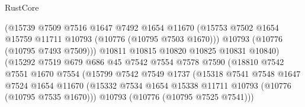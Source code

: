 \begin{lexlean}{RustCore}
\begin{coremodule}
                                    (@15739
                                      @7509
                                      @7516
                                      @1647
                                      @7492
                                      @1654
                                      @11670
                                      (@15753
                                        @7502
                                        @1654
                                        @15759
                                        @11711
                                        @10793
                                        (@10776 (@10795 @7503 @1670)))
                                      @10793
                                      (@10776 (@10795 @7493 @7509)))
                                    @10811
                                    @10815
                                    @10820
                                    @10825
                                    @10831
                                    @10840)
                                  (@15292
                                    @7519
                                    @679
                                    @686
                                    @45
                                    @7542
                                    @7554
                                    @7578
                                    @7590
                                    (@18810
                                      @7542
                                      @7551
                                      @1670
                                      @7554
                                      (@15799
                                        @7542
                                        @7549
                                        @1737
                                        (@15318
                                          @7541
                                          @7548
                                          @1647
                                          @7524
                                          @1654
                                          @11670
                                          (@15332
                                            @7534
                                            @1654
                                            @15338
                                            @11711
                                            @10793
                                            (@10776 (@10795 @7535 @1670)))
                                          @10793
                                          (@10776 (@10795 @7525 @7541)))

\end{coremodule}
\end{lexlean}
